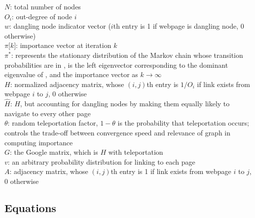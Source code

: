 \documentclass{article}
\newcommand{\MatrixVariable}[1]{\bm{\mathit{#1}}}
\begin{document}
$N$: total number of nodes \\
$O_i$: out-degree of node $i$ \\
$\MatrixVariable{w}$: dangling node indicator vector ($i$th entry is 1 if webpage is dangling node, 0 otherwise) \\
$\pi \lbrack k \rbrack$: importance vector at iteration $k$ \\
$\pi^*$: represents the stationary distribution of the Markov chain whose transition probabilities are in \MatrixVariable{G}, is the left eigenvector corresponding to the dominant eigenvalue of \MatrixVariable{G}, and the importance vector as $k \to \infty$ \\
$\MatrixVariable{H}$: normalized adjacency matrix, whose $(i,j)$th entry is $1/O_i$ if link exists from webpage $i$ to $j$, 0 otherwise \\
$\hat{\MatrixVariable{H}}$: $\MatrixVariable{H}$, but accounting for dangling nodes by making them equally likely to navigate to every other page \\
$\theta$: random teleportation factor, $1-\theta$ is the probability that teleportation occurs; controls the trade-off between convergence speed and relevance of graph in computing importance  \\
$\MatrixVariable{G}$: the Google matrix, which is $\MatrixVariable{H}$ with teleportation \\
$\MatrixVariable{v}$: an arbitrary probability distribution for linking to each page \\
$\MatrixVariable{A}$: adjacency matrix, whose $(i,j)$th entry is 1 if link exists from webpage $i$ to $j$, 0 otherwise \\

\subsection{Equations}
\end{document}
